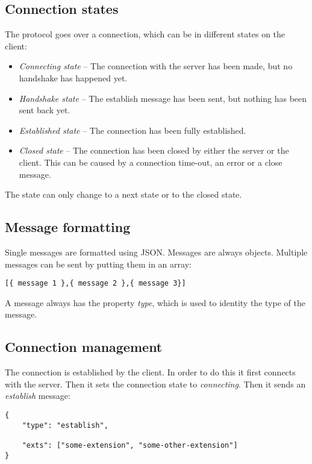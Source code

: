 \documentclass[11pt,a4paper]{article}
\begin{document}
\newpage
\subsection{Connection states}

The protocol goes over a connection, which can be in different states on the client:

\begin{itemize}
\item \textit{Connecting state} -- The connection with the server has been made, but no handshake has happened yet.
\item \textit{Handshake state} -- The establish message has been sent, but nothing has been sent back yet.
\item \textit{Established state} -- The connection has been fully established.
\item \textit{Closed state} -- The connection has been closed by either the server or the client.
This can be caused by a connection time-out, an error or a close message.
\end{itemize}

The state can only change to a next state or to the closed state.

\subsection{Message formatting}

Single messages are formatted using JSON.
Messages are always objects.
Multiple messages can be sent by putting them in an array:

\begin{verbatim}
[{ message 1 },{ message 2 },{ message 3}]
\end{verbatim}

A message always has the property \textit{type}, which is used to identity the type of the message.

\subsection{Connection management}

The connection is established by the client.
In order to do this it first connects with the server.
Then it sets the connection state to \textit{connecting}.
Then it sends an \textit{establish} message:

\begin{verbatim}
{
    "type": "establish",

    "exts": ["some-extension", "some-other-extension"]
}
\end{verbatim}
\end{document}
